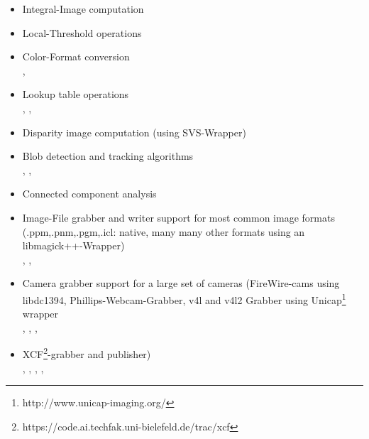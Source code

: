 \begin{itemize}
\item Integral-Image computation\\

\item Local-Threshold operations\\

\item Color-Format conversion\\
, 

\item Lookup table operations\\
, , 

\item Disparity image computation (using SVS-Wrapper)\\

\item Blob detection and tracking algorithms\\
, , 

\item Connected component analysis\\

\item Image-File grabber and writer support for most common image formats (.ppm,.pnm,.pgm,.icl: native, many many other formats using an libmagick++-Wrapper)\\
, , 

\item Camera grabber support for a large set of cameras (FireWire-cams using libdc1394, Phillips-Webcam-Grabber, v4l and v4l2 Grabber using Unicap\footnote{http://www.unicap-imaging.org/} wrapper\\
, , , 

\item XCF\footnote{https://code.ai.techfak.uni-bielefeld.de/trac/xcf}-grabber and publisher)\\
, , ,
,    


\end{itemize}
